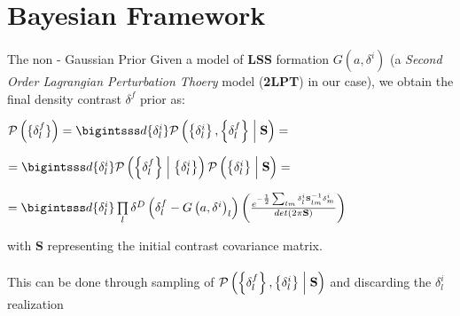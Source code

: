 \documentclass[10pt]{beamer}
\begin{document}
\section[Bayesian Framework]{Bayesian Framework}


\begin{frame}[fragile]{The non - Gaussian Prior}
Given a model of \textbf{LSS} formation $G\left(a,\delta^i\right)$ (a \textit{Second Order Lagrangian Perturbation Thoery} model (\textbf{2LPT}) in our case), we obtain the final density contrast $\delta^f$ prior as:\\
\begin{center}
    \begingroup\makeatletter{}\check@mathfonts
$\mathcal{P}\left(\{\delta_l^f\}\right)=\bigintsss d\{\delta_l^i\}\mathcal{P}\left(\left\{\delta_l^i\right\},\left\{\delta_l^f\right\}\Bigm| \textbf{S}\right)=$
\endgroup
\hfill

\pause
\begingroup\makeatletter{}\check@mathfonts
$ =\bigintsss d\{\delta_l^i\}\mathcal{P}\left(\left\{\delta_l^f\right\}\Bigm|\left\{\delta_l^i\right\} \right)\mathcal{P}\left(\left\{\delta_l^i\right\}\Bigm| \textbf{S}\right)=$
\endgroup
\hfill

\pause

\begingroup\makeatletter{}\check@mathfonts
$ =\bigintsss d\{\delta_l^i\}\prod\limits_l\delta^D\left(\delta_l^f-G\left(a,\delta^i\right)_l\right)\left(\frac{e^{-\frac{1}{2}\sum_{lm}\delta_l^i\textbf{S}_{lm}^{-1}\delta_m^i}}{det\left(2\pi\textbf{S}\right)}\right)$\endgroup
\end{center}
\pause
with \textbf{S} representing the initial contrast covariance matrix. \\
\hfill\\
This can be done through sampling of $\mathcal{P}\left(\left\{\delta_l^f\right\},\left\{\delta_l^i\right\}\Bigm| \textbf{S}\right)$ and discarding the $\delta_l^i$ realization
\end{frame}
\end{document}
